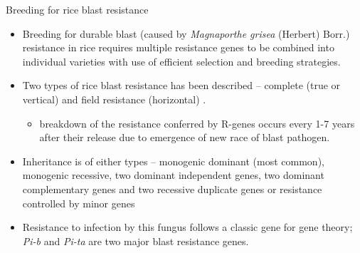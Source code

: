 \documentclass[11pt,dvipsnames,ignorenonframetext,aspectratio=169]{beamer}
\providecommand{\tightlist}{%
  \setlength{\itemsep}{0pt}\setlength{\parskip}{0pt}}
\begin{document}
\begin{frame}{Breeding for rice blast resistance}
\protect\hypertarget{breeding-for-rice-blast-resistance}{}
\begin{itemize}
\tightlist
\item
  Breeding for durable blast (caused by \emph{Magnaporthe grisea}
  (Herbert) Borr.) resistance in rice requires multiple resistance genes
  to be combined into individual varieties with use of efficient
  selection and breeding strategies.
\item
  Two types of rice blast resistance has been described -- complete
  (true or vertical) and field resistance (horizontal)
  \citep{fukuoka2019strategies}.

  \begin{itemize}
  \tightlist
  \item
    breakdown of the resistance conferred by R-genes occurs every 1-7
    years after their release due to emergence of new race of blast
    pathogen.
  \end{itemize}
\item
  Inheritance is of either types -- monogenic dominant (most common),
  monogenic recessive, two dominant independent genes, two dominant
  complementary genes and two recessive duplicate genes or resistance
  controlled by minor genes
\item
  Resistance to infection by this fungus follows a classic gene for gene
  theory; \emph{Pi-b} and \emph{Pi-ta} are two major blast resistance
  genes.
\end{itemize}
\end{frame}
\end{document}
